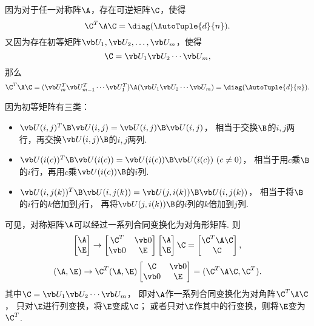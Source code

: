 \begin{theorem}
因为对于任一对称阵\(\A\)，存在可逆矩阵\(\C\)，使得\[
	\C^T\A\C=\diag(\AutoTuple{d}{n}).
\]
又因为存在初等矩阵\(\P_1,\P_2,\dotsc,\P_m\)，使得\[
	\C=\P_1\P_2\dotsm\P_m,
\]
那么\[
	\C^T\A\C
	= (\P_m^T\P_{m-1}^T\dotsm\P_1^T)\A(\P_1\P_2\dotsm\P_m)
	= \diag(\AutoTuple{d}{n}).
\]

因为初等矩阵有三类：\begin{itemize}
	\item \(\P(i,j)^T\B\P(i,j)=\P(i,j)\B\P(i,j)\)，
	相当于交换\(\B\)的\(i,j\)两行，再交换\(\P(i,j)\B\)的\(i,j\)两列.
	\item \(\P(i(c))^T\B\P(i(c))=\P(i(c))\B\P(i(c))\ (c \neq 0)\)，
	相当于用\(c\)乘\(\B\)的\(i\)行，再用\(c\)乘\(\P(i(c))\B\)的\(i\)列.
	\item \(\P(i,j(k))^T\B\P(i,j(k))=\P(j,i(k))\B\P(i,j(k))\)，
	相当于将\(\B\)的\(i\)行的\(k\)倍加到\(j\)行，
	再将\(\P(j,i(k))\B\)的\(i\)列的\(k\)倍加到\(j\)列.
\end{itemize}
可见，对称矩阵\(\A\)可以经过一系列合同变换化为对角形矩阵.
则\[
	\begin{bmatrix} \A \\ \E \end{bmatrix}
	\to
	\begin{bmatrix} \C^T & \vb0 \\ \vb0 & \E \end{bmatrix}
	\begin{bmatrix} \A \\ \E \end{bmatrix}
	\C
	= \begin{bmatrix} \C^T\A\C \\ \C \end{bmatrix},
\]\[
	(\A,\E)
	\to
	\C^T (\A,\E) \begin{bmatrix}
		\C & \vb0 \\
		\vb0 & \E
	\end{bmatrix}
	= (\C^T\A\C,\C^T).
\]
其中\(\C=\P_1\P_2\dotsm\P_m\)，
即对\(\A\)作一系列合同变换化为对角阵\(\C^T\A\C\)，
只对\(\E\)进行列变换，将\(\E\)变成\(\C\)；
或者只对\(\E\)作其中的行变换，则将\(\E\)变为\(\C^T\).
\end{theorem}
